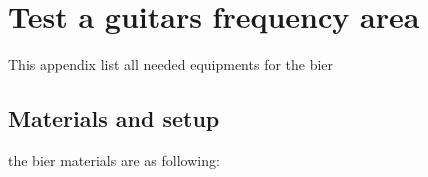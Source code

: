 \chapter{Test a guitars frequency area}
This appendix list all needed equipments for the \gls{bier} 

\section*{Materials and setup}
the \gls{bier} materials are as following:


\startequipment
{}
\stopequipment


